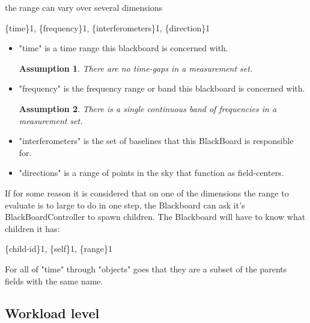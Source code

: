 \documentclass[]{lofar}
\newtheorem{assumption}{Assumption}[section]
\begin{document}
      the range can vary over several dimensions

      \{time\}1, \{frequency\}1, \{interferometers\}1, \{direction\}1

      \begin{itemize}

	\item 

          "time" is a time range this blackboard is concerned with.
          \begin{assumption}
            There are no time-gaps in a measurement set.
            \label{ass:time-gaps}
          \end{assumption}

	\item 

          "frequency" is the frequency range or band this blackboard
          is concerned with.

          \begin{assumption}
            There is a single continuous band of frequencies in a
            measurement set.
            \label{ass:one-band}
          \end{assumption}

	\item 

          "interferometers" is the set of baselines that this
          BlackBoard is responsible for.

	\item 

          "directions" is a range of points in the sky that function
          as field-centers.

      \end{itemize}

      If for some reason it is considered that on one of the
      dimensions the range to evaluate is to large to do in one step,
      the Blackboard can ask it's BlackBoardController to spawn
      children. The Blackboard will have to know what children it has:

      \{child-id\}1, \{self\}1, \{range\}1

      For all of "time" through "objects" goes that they are a subset
      of the parents fields with the same name.

    \subsection{Workload level}
    \label{subsec:workload-level}\hypertarget{subsec:workload-level}{}%
\end{document}
